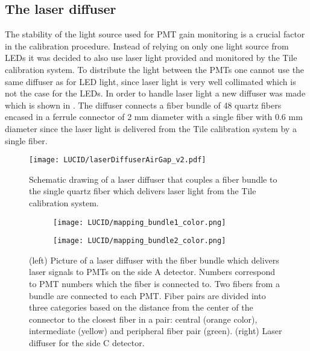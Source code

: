 
\subsection{The laser diffuser}
\label{subsec:laserDiffuser}

The stability of the light source used for PMT gain monitoring is a crucial factor in the calibration procedure.
Instead of relying on only one light source from LEDs it was decided to also use laser light
provided and monitored by the Tile calibration system. 
To distribute the light between the PMTs one cannot use the same diffuser as for LED light, 
since laser light is very well collimated which is not the case for the LEDs.
In order to handle laser light a new diffuser was made which is shown in .
The diffuser connects a fiber bundle of 48 quartz fibers encased in a ferrule connector of 2 mm diameter with a single fiber with 0.6 mm diameter
since the laser light is delivered from the Tile calibration system by a single fiber.

\begin{figure}
\centering
\texttt{[image: LUCID/laserDiffuserAirGap\_v2.pdf]}
\caption{Schematic drawing of a laser diffuser that couples a fiber bundle to the single quartz fiber which delivers laser light from the Tile calibration system.}
\label{fig:laserDiffuserSchematics}
\end{figure}

\begin{figure}
\centering
\begin{subfigure}{.45\textwidth}
  \centering
  \texttt{[image: LUCID/mapping\_bundle1\_color.png]}
\end{subfigure}%
\begin{subfigure}{.45\textwidth}
  \centering
  \texttt{[image: LUCID/mapping\_bundle2\_color.png]}
\end{subfigure}
\caption{(left) Picture of a laser diffuser with the fiber bundle which delivers laser signals to PMTs on the side A detector. 
Numbers correspond to PMT numbers which the fiber is connected to. 
Two fibers from a bundle are connected to each PMT. 
Fiber pairs are divided into three categories based on the distance from the center of the connector to the closest fiber 
in a pair: central (orange color), intermediate (yellow) and peripheral fiber pair (green).
(right) Laser diffuser for the side C detector.}
\label{fig:laserDiffuserMapping}
\end{figure}

